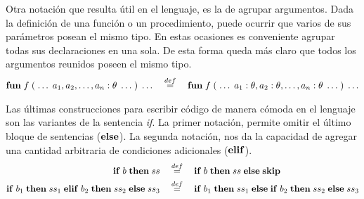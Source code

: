 Otra notación que resulta útil en el lenguaje, es la de agrupar argumentos.
Dada la definición de una función o un procedimiento, puede ocurrir que varios de sus parámetros posean el mismo tipo.
En estas ocasiones es conveniente agrupar todas sus declaraciones en una sola.
De esta forma queda más claro que todos los argumentos reunidos poseen el mismo tipo.
\begin{gather*}
\mathbf{fun} \; f \; ( \; \ldots \; a_1, a_2, \ldots, a_n : \theta \; \ldots \; )
 \; \ldots
\quad
\overset{def}{=}
\quad
\mathbf{fun} \; f \; ( \; \ldots \; a_1 : \theta, a_2 : \theta, \ldots, a_n : \theta \; \ldots \; )
 \; \ldots
\end{gather*}

Las últimas construcciones para escribir código de manera cómoda en el lenguaje son las variantes de la sentencia \textit{if}.
La primer notación, permite omitir el último bloque de sentencias ($\mathbf{else}$).
La segunda notación, nos da la capacidad de agregar una cantidad arbitraria de condiciones adicionales ($\mathbf{elif}$).
\begin{align*}
\mathbf{if} \; b \; \mathbf{then} \; ss
\quad
&\overset{def}{=}
\quad
\mathbf{if} \; b \; \mathbf{then} \; ss \; \mathbf{else} \; \mathbf{skip}
\\
\mathbf{if} \; b_1 \; \mathbf{then} \; ss_1 \; \mathbf{elif} \; b_2 \; \mathbf{then} \; ss_2 \; \mathbf{else} \; ss_3
\quad
&\overset{def}{=}
\quad
\mathbf{if} \; b_1 \; \mathbf{then} \; ss_1 \; \mathbf{else} \; \mathbf{if} \; b_2 \; \mathbf{then} \; ss_2 \; \mathbf{else} \; ss_3
\end{align*}